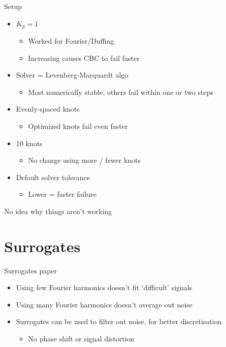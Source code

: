 \documentclass[presentation]{beamer}
\begin{document}
\begin{frame}[label={sec:orgc6e83aa}]{Setup}
\begin{itemize}
\item \(K_p=1\)
\begin{itemize}
\item Worked for Fourier/Duffing
\item Increasing causes CBC to fail faster
\end{itemize}
\item Solver = Levenberg-Marquardt algo
\begin{itemize}
\item Most numerically stable; others fail within one or two steps
\end{itemize}
\item Evenly-spaced knots
\begin{itemize}
\item Optimized knots fail even faster
\end{itemize}
\item 10 knots
\begin{itemize}
\item No change using more / fewer knots
\end{itemize}
\item Default solver tolerance
\begin{itemize}
\item Lower = faster failure
\end{itemize}
\end{itemize}

No idea why things aren't working
\end{frame}

\section{Surrogates}
\label{sec:org69e31a0}
\begin{frame}[label={sec:org9f0dfdc}]{Surrogates paper}
\begin{itemize}
\item Using few Fourier harmonics doesn't fit `difficult' signals
\end{itemize}
\vfill
\begin{itemize}
\item Using many Fourier harmonics doesn't average out noise
\end{itemize}
\vfill
\begin{itemize}
\item Surrogates can be used to filter out noise, for better discretisation
\begin{itemize}
\item No phase shift or signal distortion
\end{itemize}
\end{itemize}
\end{frame}
\end{document}
